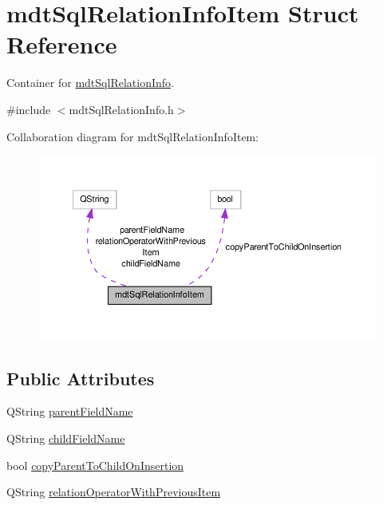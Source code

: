 \hypertarget{structmdt_sql_relation_info_item}{\section{mdt\-Sql\-Relation\-Info\-Item Struct Reference}
\label{structmdt_sql_relation_info_item}
}


Container for \hyperlink{classmdt_sql_relation_info}{mdt\-Sql\-Relation\-Info}.  




{\ttfamily \#include $<$mdt\-Sql\-Relation\-Info.\-h$>$}



Collaboration diagram for mdt\-Sql\-Relation\-Info\-Item\-:
\nopagebreak
\begin{figure}[H]
\begin{center}
\leavevmode
\includegraphics[width=350pt]{structmdt_sql_relation_info_item__coll__graph}
\end{center}
\end{figure}
\subsection*{Public Attributes}
\begin{DoxyCompactItemize}
\item 
Q\-String \hyperlink{structmdt_sql_relation_info_item_a2ab8ed9e084a85cc0303b7d983f5e270}{parent\-Field\-Name}
\item 
Q\-String \hyperlink{structmdt_sql_relation_info_item_a472e45de5f24377bb92740ece7f34a07}{child\-Field\-Name}
\item 
bool \hyperlink{structmdt_sql_relation_info_item_ad0c6a47d4463fd80f1696bbfc6c3b402}{copy\-Parent\-To\-Child\-On\-Insertion}
\item 
Q\-String \hyperlink{structmdt_sql_relation_info_item_a30754ae8014357e546d00698d1d79d32}{relation\-Operator\-With\-Previous\-Item}
\end{DoxyCompactItemize}


